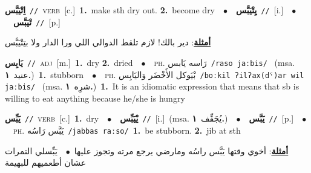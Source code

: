 \documentclass[10pt,a4paper,twoside]{article} %
\begin{document}
\begin{multicols}{2}
{\setlength\topsep{0pt}\textbf{\foreignlanguage{arabic}{اِتْيَبَّس}}\ {\color{gray}\texttt{//}\color{black}}\ \textsc{verb}\ [c.]\ \textbf{1.}~make sth dry out.  \textbf{2.}~become dry\ \ $\bullet$\ \ \setlength\topsep{0pt}\textbf{\foreignlanguage{arabic}{يِتْيَبَّس}}\ {\color{gray}\texttt{//}\color{black}}\ [i.]\ \ $\bullet$\ \ \setlength\topsep{0pt}\textbf{\foreignlanguage{arabic}{تْيَبَّس}}\ {\color{gray}\texttt{//}\color{black}}\ [p.]\  \begin{flushright}\color{gray}\foreignlanguage{arabic}{\textbf{\underline{\foreignlanguage{arabic}{أمثلة}}}: دير بالك! لازم تلقط الدوالي اللي ورا الدار ولا بتِتْيَبَّس}\end{flushright}\color{black}} \vspace{2mm}

{\setlength\topsep{0pt}\textbf{\foreignlanguage{arabic}{يَابِس}}\ {\color{gray}\texttt{//}\color{black}}\ \textsc{adj}\ [m.]\ \textbf{1.}~dry  \textbf{2.}~dried\ \ $\bullet$\ \ \textsc{ph.} \color{gray} \foreignlanguage{arabic}{رَاسه يَابس}\color{black}\ {\color{gray}\texttt{/{\sffamily raso jaːbis}/}\color{black}}\ \color{gray} (msa. \foreignlanguage{arabic}{عنيد}~\foreignlanguage{arabic}{\textbf{١.}})\color{black}\ \textbf{1.}~stubborn\ \ $\bullet$\ \ \textsc{ph.} \color{gray} \foreignlanguage{arabic}{بْيَوكل الأَخْضَر وَاليَابِس}\color{black}\ {\color{gray}\texttt{/{\sffamily boːkil ʔilʔax(dˤ)ar wil jaːbis}/}\color{black}}\ \color{gray} (msa. \foreignlanguage{arabic}{شرِه}~\foreignlanguage{arabic}{\textbf{١.}})\color{black}\ \textbf{1.}~It is an idiomatic expression that means that sb is willing to eat anything because he/she is hungry\ 

{\setlength\topsep{0pt}\textbf{\foreignlanguage{arabic}{يَبِّس}}\ {\color{gray}\texttt{//}\color{black}}\ \textsc{verb}\ [c.]\ \textbf{1.}~dry\ \ $\bullet$\ \ \setlength\topsep{0pt}\textbf{\foreignlanguage{arabic}{يْيَبِّس}}\ {\color{gray}\texttt{//}\color{black}}\ [i.]\ \color{gray}(msa. \foreignlanguage{arabic}{يُجَفِّف}~\foreignlanguage{arabic}{\textbf{١.}})\color{black}\ \ $\bullet$\ \ \setlength\topsep{0pt}\textbf{\foreignlanguage{arabic}{يَبَّس}}\ {\color{gray}\texttt{//}\color{black}}\ [p.]\ \ $\bullet$\ \ \textsc{ph.} \color{gray} \foreignlanguage{arabic}{يَبَّس رَاسُه}\color{black}\ {\color{gray}\texttt{/{\sffamily jabbas raːso}/}\color{black}}\ \textbf{1.}~be stubborn.  \textbf{2.}~jib at sth\  \begin{flushright}\color{gray}\foreignlanguage{arabic}{\textbf{\underline{\foreignlanguage{arabic}{أمثلة}}}: أخوي وقتها يَبَّس راسُه ومارضي يرجع مرته وتجوز عليها\ $\bullet$\ \  يَبِّسلي التمرات عشان أطعميهم للبهيمة}\end{flushright}\color{black}} \vspace{2mm}

}
\end{multicols}
\end{document}
